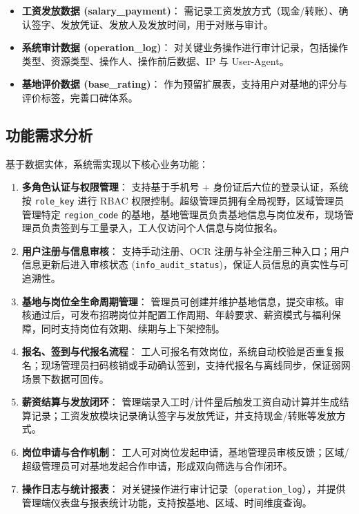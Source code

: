 \documentclass[UTF8,a4paper,12pt]{article}
\begin{document}
\begin{itemize}
    \item \textbf{工资发放数据 (salary\_payment)}：
    需记录工资发放方式（现金/转账）、确认签字、发放凭证、发放人及发放时间，用于对账与审计。
    
    \item \textbf{系统审计数据 (operation\_log)}：
    对关键业务操作进行审计记录，包括操作类型、资源类型、操作人、操作前后数据、IP 与 User-Agent。
    
    \item \textbf{基地评价数据 (base\_rating)}：
    作为预留扩展表，支持用户对基地的评分与评价标签，完善口碑体系。
\end{itemize}

\subsection{功能需求分析}
基于数据实体，系统需实现以下核心业务功能：

\begin{enumerate}
    \item \textbf{多角色认证与权限管理}：
    支持基于手机号 + 身份证后六位的登录认证，系统按 \texttt{role\_key} 进行 RBAC 权限控制。超级管理员拥有全局视野，区域管理员管理特定 \texttt{region\_code} 的基地，基地管理员负责基地信息与岗位发布，现场管理员负责签到与工量录入，工人仅访问个人信息与岗位报名。

    \item \textbf{用户注册与信息审核}：
    支持手动注册、OCR 注册与补全注册三种入口；用户信息更新后进入审核状态 (\texttt{info\_audit\_status})，保证人员信息的真实性与可追溯性。

    \item \textbf{基地与岗位全生命周期管理}：
    管理员可创建并维护基地信息，提交审核。审核通过后，可发布招聘岗位并配置工作周期、年龄要求、薪资模式与福利保障，同时支持岗位有效期、续期与上下架控制。

    \item \textbf{报名、签到与代报名流程}：
    工人可报名有效岗位，系统自动校验是否重复报名；现场管理员扫码核销或手动确认签到，支持代报名与离线同步，保证弱网场景下数据可回传。

    \item \textbf{薪资结算与发放闭环}：
    管理端录入工时/计件量后触发工资自动计算并生成结算记录；工资发放模块记录确认签字与发放凭证，并支持现金/转账等发放方式。

    \item \textbf{岗位申请与合作机制}：
    工人可对岗位发起申请，基地管理员审核反馈；区域/超级管理员可对基地发起合作申请，形成双向筛选与合作闭环。

    \item \textbf{操作日志与统计报表}：
    对关键操作进行审计记录（\texttt{operation\_log}），并提供管理端仪表盘与报表统计功能，支持按基地、区域、时间维度查询。
\end{enumerate}
\end{document}
